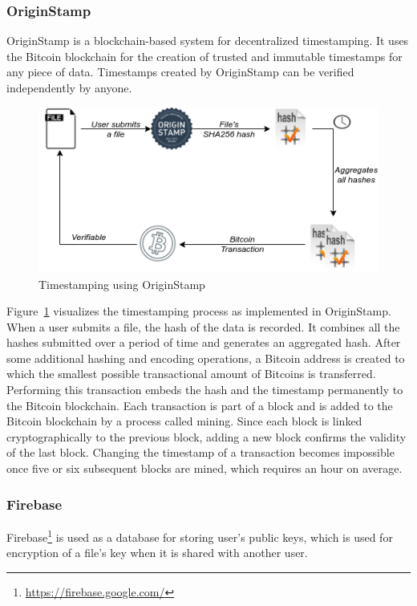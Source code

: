 \subsubsection{OriginStamp}\label{sec:originstamp}
OriginStamp\cite{hepp2018originstamp} is a blockchain-based system for decentralized timestamping. It uses the Bitcoin blockchain for the creation of trusted and immutable timestamps for any piece of data. Timestamps created by OriginStamp can be verified independently by anyone.

\begin{figure}[h]
	\includegraphics[width=\linewidth]{figures/origin-stamp}
	\caption{\label{fig:originstamp} Timestamping using OriginStamp}
\end{figure}

Figure~\ref{fig:originstamp} visualizes the timestamping process as implemented in OriginStamp. When a user submits a file, the hash of the data is recorded. It combines all the hashes submitted over a period of time and generates an aggregated hash. After some additional hashing and encoding operations, a Bitcoin address is created to which the smallest possible transactional amount of Bitcoins is transferred. Performing this transaction embeds the hash and the timestamp permanently to the Bitcoin blockchain. Each transaction is part of a block and is added to the Bitcoin blockchain by a process called mining. Since each block is linked cryptographically to the previous block, adding a new block confirms the validity of the last block. Changing the timestamp of a transaction becomes impossible once five or six subsequent blocks are mined, which requires an hour on average\cite{nakamoto2008bitcoin}.

\subsubsection{Firebase}
Firebase\footnote{\url{https://firebase.google.com/}} is used as a database for storing user's public keys, which is used for encryption of a file's key when it is shared with another user.

